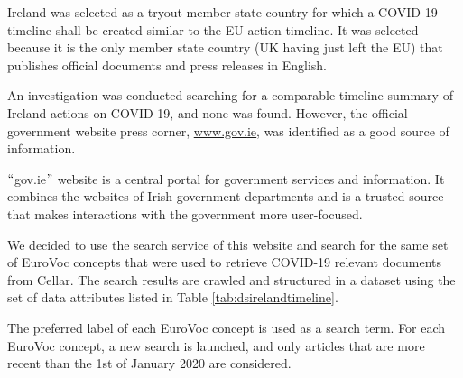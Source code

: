 Ireland was selected as a tryout member state country for which a COVID-19 timeline shall be created similar to the EU action timeline. It was selected because it is the only member state country (UK having just left the EU) that publishes official documents and press releases in English. 

An investigation was conducted searching for a comparable timeline summary of Ireland actions on COVID-19, and none was found. However, the official government website press corner, \href{http://www.gov.ie}{\textcolor[HTML]{1155CC}{\ul{www.gov.ie}}}, was identified as a good source of information. 

$``$gov.ie$"$  website is a central portal for government services and information. It combines the websites of Irish government departments and is a trusted source that makes interactions with the government more user-focused.

We decided to use the search service of this website and search for the same set of EuroVoc concepts that were used to retrieve COVID-19 relevant documents from Cellar. The search results are crawled and structured in a dataset using the set of data attributes listed in  Table \ref{tab:dsirelandtimeline}. 

The preferred label of each EuroVoc concept is used as a search term. For each EuroVoc concept, a new search is launched, and only articles that are more recent than the 1st of January 2020 are considered.


